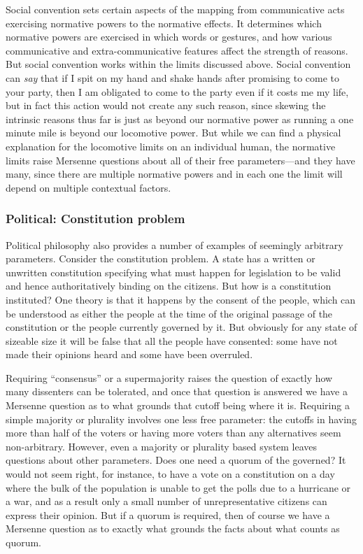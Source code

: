 Social convention sets certain aspects of the mapping from communicative acts exercising normative powers to the normative
effects. It determines which normative powers are exercised in which words or gestures, and how various communicative and
extra-communicative features affect the strength of reasons. But social convention works within the limits discussed
above. Social convention can \textit{say} that if I spit on my hand and shake hands after promising to come to your
party, then I am obligated to come to the party even if it costs me my life, but in fact this action would not create
any such reason, since skewing the intrinsic reasons thus far is just as beyond our normative power as running a one minute
mile is beyond our locomotive power. But while we can find a physical explanation for the locomotive limits on an 
individual human, the normative limits raise Mersenne questions about all of their free parameters---and they have many,
since there are multiple normative powers and in each one the limit will depend on multiple contextual factors.

\subsubsection{Political: Constitution problem}
Political philosophy also provides a number of examples of seemingly arbitrary parameters. Consider the constitution problem. A state has a written or unwritten
constitution specifying what must happen for legislation to be valid and hence authoritatively binding on the citizens. But 
how is a constitution instituted? One theory is that it happens by the consent of the people, which can be understood
as either the people at the time of the original passage of the constitution or the people currently governed by
it. But obviously for any state
of sizeable size it will be false that all the people have consented: some have not made their opinions heard and some have been
overruled. 

Requiring ``consensus'' or a supermajority raises the question of exactly how many dissenters can be tolerated, and
once that question is answered we have a Mersenne question as to what grounds that cutoff being where it is. Requiring a simple
majority or plurality involves one less free parameter: the cutoffs in having more than half of the voters or having more voters
than any alternatives seem non-arbitrary. However, even a majority or plurality based system leaves questions about other parameters.
Does one need a quorum of the governed? It would not seem right, for instance, to have a vote on a constitution on a day 
where the bulk of the population is unable to get the polls due to a hurricane or a war, and as a result only a small number of
unrepresentative citizens can express their opinion. But if a quorum is required, then of course we have a Mersenne question
as to exactly what grounds the facts about what counts as quorum.

